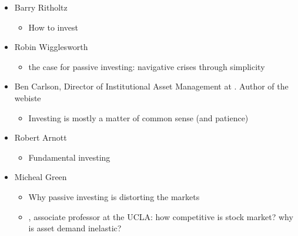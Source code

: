 \documentclass[letterpaper,10pt,english]{jupyterBook}
\begin{document}
\begin{itemize}
\begin{itemize}
\end{itemize}

\item {} 
\sphinxAtStartPar
Barry Ritholtz
\begin{itemize}
\item {} 
\sphinxAtStartPar
{} How  to invest

\end{itemize}

\item {} 
\sphinxAtStartPar
Robin Wigglesworth
\begin{itemize}
\item {} 
\sphinxAtStartPar
{} the case for passive investing: navigative crises through simplicity

\end{itemize}

\item {} 
\sphinxAtStartPar
Ben Carlson, Director of Institutional Asset Management at {\hyperref[\detokenize{ch/people/list:fin-edu-resources-firms-ritholtz}]{}}. Author of the webiste 
\begin{itemize}
\item {} 
\sphinxAtStartPar
{} Investing is mostly a matter of common sense (and patience)

\end{itemize}

\item {} 
\sphinxAtStartPar
Robert Arnott
\begin{itemize}
\item {} 
\sphinxAtStartPar
{} Fundamental investing

\end{itemize}

\item {} 
\sphinxAtStartPar
Micheal Green
\begin{itemize}
\item {} 
\sphinxAtStartPar
{} Why passive investing is distorting the markets

\item {} 
\sphinxAtStartPar
{}, associate professor at the UCLA: how competitive is stock market? why is asset demand inelastic?


\end{itemize}
\end{itemize}
\end{document}

